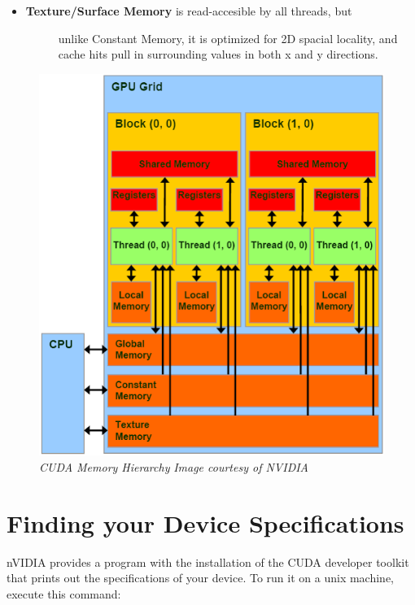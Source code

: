 \documentclass[letterpaper,10pt,openany,oneside]{sphinxmanual}
\begin{document}
\begin{itemize}
\begin{description}
\end{description}

\item {} \begin{description}
\item[{\textbf{Texture/Surface Memory} is read-accesible by all threads, but}] \leavevmode
unlike Constant Memory, it is optimized for 2D spacial
locality, and cache hits pull in surrounding values in both
x and y directions.

\end{description}

\end{itemize}
\begin{figure}[htbp]
\centering
\capstart

\includegraphics{memheirarchy.png}
\caption{\emph{CUDA Memory Hierarchy}
\emph{Image courtesy of NVIDIA}}\end{figure}


\section{Finding your Device Specifications}
\label{0-Architecture/Architecture:finding-your-device-specifications}
nVIDIA provides a program with the installation of the CUDA developer toolkit
that prints out the specifications of
your device. To run it on a unix machine, execute this command:
\end{document}
